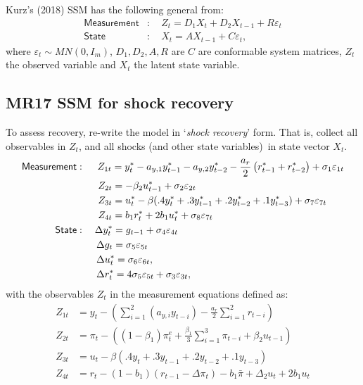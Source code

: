 \documentclass[a4paper,12pt]{article}
\newcommand{\bsq}{\begin{subequations}}\newcommand{\esq}{\end{subequations}}
\newcommand{\vsp}[1]{\vspace*{#1mm}}\newcommand{\hsp}[1]{\hspace*{#1mm}}  }
\begin{document}
Kurz's (2018) SSM has the following general from:\bsq\label{SSM}%
\begin{align}
\mathsf{Measurement}& :\quad Z_{t}=D_{1}X_{t}+D_{2}X_{t-1}+R\varepsilon _{t}
\label{ssm1} \\
\mathsf{State}& :\quad X_{t}=AX_{t-1}+C\varepsilon _{t},  \label{ssm2}
\end{align}%
\esq where $\varepsilon _{t}\sim MN(0,I_{m})$, $D_{1},D_{2},A,R$ are $C$ are
conformable system matrices, $Z_{t}$ the observed variable and $X_{t}$ the
latent state variable.

\subsection{MR17 SSM for shock recovery}

To assess recovery, re-write the model in `\emph{shock recovery}' form. That
is, collect all observables in $Z_{t}$, and all shocks (and other state
variables)\ in state vector $X_{t}$.\bsq\label{ssm0}%
\begin{align}
\mathsf{Measurement}& :\;\quad Z_{1t}=y_{t}^{\ast }-a_{y,1}y_{t-1}^{\ast
}-a_{y,2}y_{t-2}^{\ast }-\frac{a_{r}}{2}\left( r_{t-1}^{\ast }+r_{t-2}^{\ast
}\right) +\sigma _{1}\varepsilon _{1t} \\
\phantom{\mathsf{Measurement}}& \,\,\;\;\phantom{:\quad}Z_{2t}=-\beta
_{2}u_{t-1}^{\ast }+\sigma _{2}\varepsilon _{2t} \\
\phantom{\mathsf{Measurement}}& \,\,\;\;\phantom{:\quad}Z_{3t}=u_{t}^{\ast
}-\beta (.4y_{t}^{\ast }+.3y_{t-1}^{\ast }+.2y_{t-2}^{\ast }+.1y_{t-3}^{\ast
})+\sigma _{7}\varepsilon _{7t} \\
\phantom{\mathsf{Measurement}}& \,\,\;\;\phantom{:\quad}Z_{4t}=b_{1}r_{t}^{%
\ast }+2b_{1}u_{t}^{\ast }+\sigma _{8}\varepsilon _{7t} \\
\mathsf{State}& :\quad \Delta y_{t}^{\ast }=g_{t-1}+\sigma _{4}\varepsilon
_{4t} \\
\phantom{\mathsf{State}}& \;\,\;\phantom{:\quad}\Delta g_{t}=\sigma
_{5}\varepsilon _{5t} \\
\phantom{\mathsf{State}}& \;\,\;\phantom{:\quad}\Delta u_{t}^{\ast }=\sigma
_{6}\varepsilon _{6t},  \label{drstar2} \\
\phantom{\mathsf{State}}& \;\,\;\phantom{:\quad}\Delta r_{t}^{\ast }=4\sigma
_{5}\varepsilon _{5t}+\sigma _{3}\varepsilon _{3t},
\end{align}%
\esq with the observables $Z_{t}$ in the measurement equations defined as:%
\vsp{-3}\bsq\label{ssmO}
\begin{align}
Z_{1t}& =y_{t}-\left( \sum_{i=1}^{2}(a_{y,i}y_{t-i})-\frac{a_{r}}{2}%
\sum_{i=1}^{2}r_{t-i}\right)  \\
Z_{2t}& =\pi _{t}-\left( (1-\beta _{1})\pi _{t}^{e}+\frac{\beta _{1}}{3}%
\sum_{i=1}^{3}\pi _{t-i}+\beta _{2}u_{t-1}\right)  \\
Z_{3t}& =u_{t}-\beta (.4y_{t}+.3y_{t-1}+.2y_{t-2}+.1y_{t-3}) \\
Z_{4t}& =r_{t}-(1-b_{1})(r_{t-1}-\Delta \pi _{t})-b_{1}\bar{\pi}+\Delta
_{2}u_{t}+2b_{1}u_{t}
\end{align}%
\esq
\end{document}
